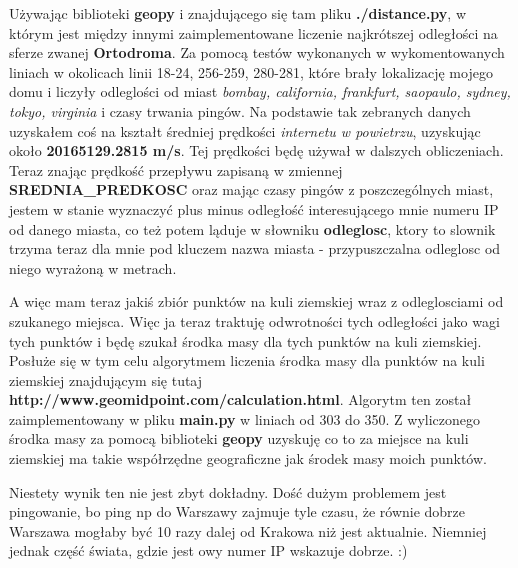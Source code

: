 \documentclass[11pt,a4paper]{article}
\begin{document}
Używając biblioteki \textbf{geopy} i znajdującego się tam pliku \textbf{./distance.py}, w którym jest między innymi zaimplementowane liczenie najkrótszej odległości na sferze zwanej \textbf{Ortodroma}. Za pomocą testów wykonanych w wykomentowanych liniach w okolicach linii 18-24, 256-259, 280-281, które brały lokalizację mojego domu i liczyły odleglości od miast \textit{bombay, california, frankfurt, saopaulo, sydney, tokyo, virginia} i czasy trwania pingów. Na podstawie tak zebranych danych uzyskałem coś na kształt
średniej prędkości \textit{internetu w powietrzu}, uzyskując około \textbf{20165129.2815 m/s}. Tej prędkości będę używał w dalszych obliczeniach. Teraz znając prędkość przepływu zapisaną w zmiennej \textbf{SREDNIA\_PREDKOSC} oraz mając czasy pingów z poszczególnych miast, jestem w stanie wyznaczyć plus minus odległość interesującego mnie numeru IP od danego miasta, co też potem ląduje w słowniku \textbf{odleglosc}, ktory to slownik trzyma teraz dla mnie pod kluczem nazwa miasta - przypuszczalna odleglosc od niego wyrażoną w metrach.

A więc mam teraz jakiś zbiór punktów na kuli ziemskiej wraz z odleglosciami od szukanego miejsca. Więc ja teraz traktuję odwrotności tych odległości jako wagi tych punktów i będę szukał środka masy dla tych punktów na kuli ziemskiej. Posłuże się w tym celu algorytmem liczenia środka masy dla punktów na kuli ziemskiej znajdującym się tutaj \textbf{http://www.geomidpoint.com/calculation.html}. Algorytm ten został zaimplementowany w pliku \textbf{main.py} w liniach od 303 do 350. Z wyliczonego środka masy za pomocą biblioteki \textbf{geopy} uzyskuję co to za miejsce na kuli ziemskiej ma takie współrzędne geograficzne jak środek masy moich punktów.

Niestety wynik ten nie jest zbyt dokładny. Dość dużym problemem jest pingowanie, bo ping np do Warszawy zajmuje tyle czasu, że równie dobrze Warszawa mogłaby być 10 razy dalej od Krakowa niż jest aktualnie. Niemniej jednak część świata, gdzie jest owy numer IP wskazuje dobrze. :)
\end{document}
